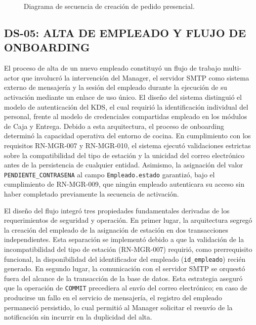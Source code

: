 \begin{landscape}
\begin{figure}[H]
    \centering
    
    \caption{Diagrama de secuencia de creación de pedido presencial.}
    \label{fig:diagrama-secuencia-creacion-pedido-presencial}
\end{figure}
\end{landscape}
\subsection{DS-05: ALTA DE EMPLEADO Y FLUJO DE ONBOARDING}
El proceso de alta de un nuevo empleado constituyó un flujo de trabajo multi-actor que involucró la intervención del Manager, el servidor SMTP como sistema externo de mensajería y la sesión del empleado durante la ejecución de su activación mediante un enlace de uso único. El diseño del sistema distinguió el modelo de autenticación del KDS, el cual requirió la identificación individual del personal, frente al modelo de credenciales compartidas empleado en los módulos de Caja y Entrega. Debido a esta arquitectura, el proceso de onboarding determinó la capacidad operativa del entorno de cocina. En cumplimiento con los requisitos RN-MGR-007 y RN-MGR-010, el sistema ejecutó validaciones estrictas sobre la compatibilidad del tipo de estación y la unicidad del correo electrónico antes de la persistencia de cualquier entidad. Asimismo, la asignación del valor \texttt{PENDIENTE\_CONTRASENA} al campo \texttt{Empleado.estado} garantizó, bajo el cumplimiento de RN-MGR-009, que ningún empleado autenticara su acceso sin haber completado previamente la secuencia de activación. 

El diseño del flujo integró tres propiedades fundamentales derivadas de los requerimientos de seguridad y operación. En primer lugar, la arquitectura segregó la creación del empleado de la asignación de estación en dos transacciones independientes. Esta separación se implementó debido a que la validación de la incompatibilidad del tipo de estación (RN-MGR-007) requirió, como prerrequisito funcional, la disponibilidad del identificador del empleado (\texttt{id\_empleado}) recién generado. En segundo lugar, la comunicación con el servidor SMTP se orquestó fuera del alcance de la transacción de la base de datos. Esta estrategia aseguró que la operación de \texttt{COMMIT} precediera al envío del correo electrónico; en caso de producirse un fallo en el servicio de mensajería, el registro del empleado permaneció persistido, lo cual permitió al Manager solicitar el reenvío de la notificación sin incurrir en la duplicidad del alta. 

